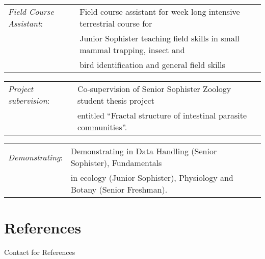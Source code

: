 \documentclass[10pt,a4paper]{article}
\begin{document}
\begin{tabular}{ll}
\textit{Field Course Assistant}:& Field course assistant for week long intensive terrestrial course for\\ 
&  Junior Sophister teaching field skills in small mammal trapping, insect and\\
& bird identification and general field skills\\
\end{tabular}

\begin{tabular}{ll}
\textit{Project subervision}:&\hspace{7.5mm}Co-supervision of Senior Sophister Zoology student thesis project\\
&\hspace{7.5mm}entitled “Fractal structure of intestinal parasite communities”.\\

\end{tabular}

\begin{tabular}{ll}
\textit{Demonstrating}:&\hspace{15mm}Demonstrating in Data Handling (Senior Sophister), Fundamentals\\ 
&\hspace{15mm}in ecology (Junior Sophister), Physiology and Botany (Senior Freshman).\\

\end{tabular}

\bigskip
\section{References}
Contact for References


\bigskip
\end{document}
